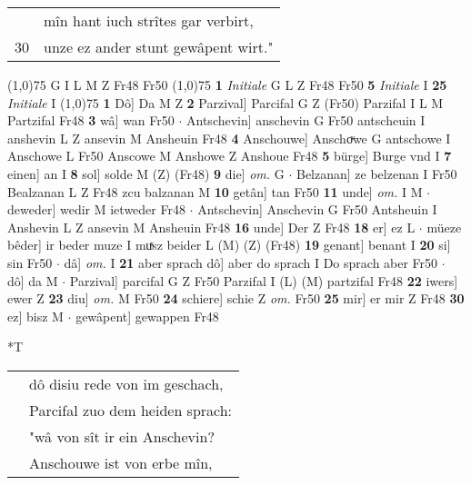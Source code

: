 \documentclass[8pt,a4paper,notitlepage]{article}
\begin{document}
\begin{table}[ht]
\begin{minipage}[t]{0.5\linewidth}
\begin{tabular}{rl}
 & mîn hant iuch strîtes gar verbirt,\\ 
30 & unze ez ander stunt gewâpent wirt."\\ 
\end{tabular}
\scriptsize
\line(1,0){75} \newline
G I L M Z Fr48 Fr50 \newline
\line(1,0){75} \newline
\textbf{1} \textit{Initiale} G L Z Fr48 Fr50  \textbf{5} \textit{Initiale} I  \textbf{25} \textit{Initiale} I  \newline
\line(1,0){75} \newline
\textbf{1} Dô] Da M Z \textbf{2} Parzival] Parcifal G Z (Fr50) Parzifal I L M Partzifal Fr48 \textbf{3} wâ] wan Fr50  $\cdot$ Antschevin] anschevin G Fr50 antscheuin I anshevin L Z ansevin M Ansheuin Fr48 \textbf{4} Anschouwe] Anschoͮwe G antschowe I Anschowe L Fr50 Anscowe M Anshowe Z Anshoue Fr48 \textbf{5} bürge] Burge vnd I \textbf{7} einen] an I \textbf{8} sol] solde M (Z) (Fr48) \textbf{9} die] \textit{om.} G  $\cdot$ Belzanan] ze belzenan I Fr50 Bealzanan L Z Fr48 zcu balzanan M \textbf{10} getân] tan Fr50 \textbf{11} unde] \textit{om.} I M  $\cdot$ deweder] wedir M ietweder Fr48  $\cdot$ Antschevin] Anschevin G Fr50 Antsheuin I Anshevin L Z ansevin M Ansheuin Fr48 \textbf{16} unde] Der Z Fr48 \textbf{18} er] ez L  $\cdot$ müeze bêder] ir beder muze I muͯsz beider L (M) (Z) (Fr48) \textbf{19} genant] benant I \textbf{20} si] sin Fr50  $\cdot$ dâ] \textit{om.} I \textbf{21} aber sprach dô] aber do sprach I Do sprach aber Fr50  $\cdot$ dô] da M  $\cdot$ Parzival] parcifal G Z Fr50 Parzifal I (L) (M) partzifal Fr48 \textbf{22} iwers] ewer Z \textbf{23} diu] \textit{om.} M Fr50 \textbf{24} schiere] schie Z \textit{om.} Fr50 \textbf{25} mir] er mir Z Fr48 \textbf{30} ez] bisz M  $\cdot$ gewâpent] gewappen Fr48 \newline
\end{minipage}
\hspace{0.5cm}
\begin{minipage}[t]{0.5\linewidth}
\small
\begin{center}*T
\end{center}
\begin{tabular}{rl}
 & dô disiu rede von im geschach,\\ 
 & Parcifal zuo dem heiden sprach:\\ 
 & "wâ von sît ir ein Anschevin?\\ 
 & Anschouwe ist von erbe mîn,\\ 

\end{tabular}
\end{minipage}
\end{table}
\end{document}
